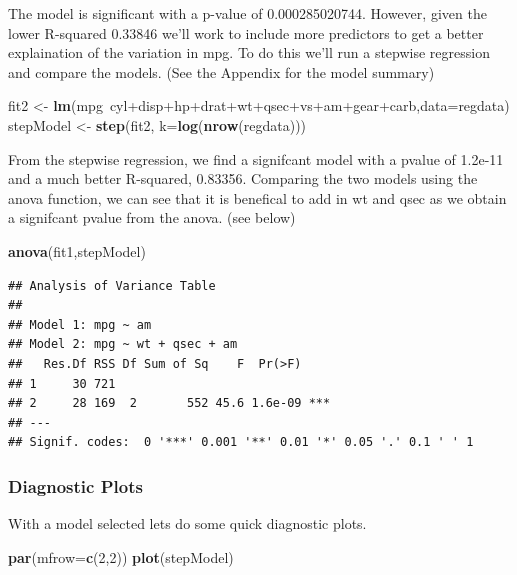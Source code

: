 \documentclass[]{article}
\newenvironment{Shaded}{\begin{snugshade}}{\end{snugshade}}
\newcommand{\KeywordTok}[1]{\textcolor[rgb]{0.13,0.29,0.53}{\textbf{{#1}}}}
\newcommand{\DataTypeTok}[1]{\textcolor[rgb]{0.13,0.29,0.53}{{#1}}}
\newcommand{\DecValTok}[1]{\textcolor[rgb]{0.00,0.00,0.81}{{#1}}}
\newcommand{\StringTok}[1]{\textcolor[rgb]{0.31,0.60,0.02}{{#1}}}
\newcommand{\NormalTok}[1]{{#1}}
\begin{document}
The model is significant with a p-value of 0.000285020744. However,
given the lower R-squared 0.33846 we'll work to include more predictors
to get a better explaination of the variation in mpg. To do this we'll
run a stepwise regression and compare the models. (See the Appendix for
the model summary)

\begin{Shaded}
\begin{Highlighting}[]
\NormalTok{fit2 <-}\StringTok{ }\KeywordTok{lm}\NormalTok{(mpg~cyl+disp+hp+drat+wt+qsec+vs+am+gear+carb,}\DataTypeTok{data=}\NormalTok{regdata)}
\NormalTok{stepModel <-}\StringTok{ }\KeywordTok{step}\NormalTok{(fit2, }\DataTypeTok{k=}\KeywordTok{log}\NormalTok{(}\KeywordTok{nrow}\NormalTok{(regdata)))}
\end{Highlighting}
\end{Shaded}

From the stepwise regression, we find a signifcant model with a pvalue
of 1.2e-11 and a much better R-squared, 0.83356. Comparing the two
models using the anova function, we can see that it is benefical to add
in wt and qsec as we obtain a signifcant pvalue from the anova. (see
below)

\begin{Shaded}
\begin{Highlighting}[]
\KeywordTok{anova}\NormalTok{(fit1,stepModel)}
\end{Highlighting}
\end{Shaded}

\begin{verbatim}
## Analysis of Variance Table
## 
## Model 1: mpg ~ am
## Model 2: mpg ~ wt + qsec + am
##   Res.Df RSS Df Sum of Sq    F  Pr(>F)    
## 1     30 721                              
## 2     28 169  2       552 45.6 1.6e-09 ***
## ---
## Signif. codes:  0 '***' 0.001 '**' 0.01 '*' 0.05 '.' 0.1 ' ' 1
\end{verbatim}

\subsubsection{Diagnostic Plots}\label{diagnostic-plots}

With a model selected lets do some quick diagnostic plots.

\begin{Shaded}
\begin{Highlighting}[]
\KeywordTok{par}\NormalTok{(}\DataTypeTok{mfrow=}\KeywordTok{c}\NormalTok{(}\DecValTok{2}\NormalTok{,}\DecValTok{2}\NormalTok{))}
\KeywordTok{plot}\NormalTok{(stepModel)}
\end{Highlighting}
\end{Shaded}
\end{document}
